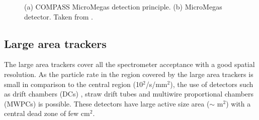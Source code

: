 \begin{figure}[!h]
  \centering
	\caption{(a) COMPASS MicroMegas detection principle. (b) MicroMegas detector. Taken from \cite{NIM}.}
	\label{pic:MM}
\end{figure}

\subsection{Large area trackers}

The large area trackers cover all the spectrometer acceptance with a good spatial resolution. As the particle rate in the region
covered by the large area trackers is small in comparison to the central region (10$^2$/s/mm$^2$), the use of detectors such as
drift chambers (DCs) \cite{}, straw drift tubes \cite{} and multiwire proportional chambers (MWPCs) is possible. These detectors
have large active size area ($\sim$ m$^2$) with a central dead zone of few cm$^2$.

